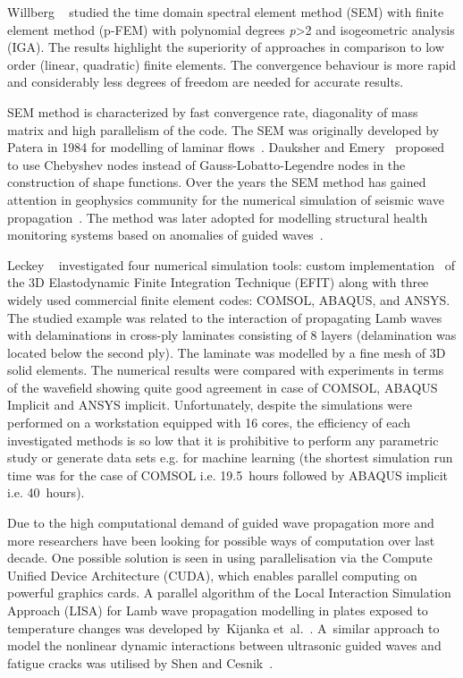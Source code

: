 Willberg \etal~\cite{Willberg2012} studied the time domain spectral element method (SEM)   with   finite element method (p-FEM) with polynomial degrees \emph{p}{\textgreater}2 and isogeometric analysis (IGA). The results highlight the superiority of   approaches in comparison to low order (linear, quadratic) finite elements. The convergence behaviour is more rapid and considerably less degrees of freedom are needed for accurate results.

SEM method is characterized by fast convergence rate, diagonality of mass matrix and high parallelism of the code. The SEM was originally developed by Patera in 1984 for modelling of laminar flows~\cite{Patera1984}. Dauksher and Emery~\cite{Dauksher1997,Dauksher2000} proposed to use Chebyshev nodes instead of Gauss-Lobatto-Legendre nodes in the construction of shape functions. Over the years the SEM method has gained attention in  geophysics community for the numerical simulation of seismic wave propagation~\cite{Seriani1998,Komatitsch2009}. The method was later adopted for modelling structural health monitoring systems based on anomalies of guided waves~\cite{Schulte2010,Ostachowicz2012,Lonkar2013}. 

Leckey \etal~\cite{Leckey2018} investigated four numerical simulation tools: custom implementation~\cite{Leckey2014} of the 3D Elastodynamic Finite Integration Technique (EFIT) \cite{Schubert1998} along with three widely used commercial finite element codes: COMSOL, ABAQUS, and ANSYS. The studied example was related to the interaction of propagating Lamb waves with delaminations in cross-ply laminates consisting of 8 layers (delamination was located below the second ply). The laminate was modelled by a fine mesh of 3D solid elements. The numerical results were compared with experiments in terms of the wavefield showing quite good agreement in case of COMSOL, ABAQUS Implicit and ANSYS implicit. Unfortunately, despite the simulations were performed on a workstation equipped with 16 cores, the efficiency of each investigated methods is so low that it is prohibitive to perform any parametric study or generate data sets e.g. for machine learning (the shortest simulation run time was for the case of COMSOL i.e. 19.5~hours followed by ABAQUS implicit i.e. 40~hours).

Due to the high computational demand of guided wave propagation   more and more researchers have been looking for possible ways of computation   over  last decade. One  possible solution is seen in using parallelisation via the Compute Unified Device Architecture (CUDA), which enables parallel computing on powerful graphics cards. A parallel algorithm of the Local Interaction Simulation Approach (LISA) for Lamb wave propagation modelling in   plates exposed to temperature changes was developed by~Kijanka et~al.~\cite{Kijanka2013}. A~similar approach to model the nonlinear dynamic interactions between ultrasonic guided waves and fatigue cracks was utilised by Shen and Cesnik~\cite{Shen2017}.  

